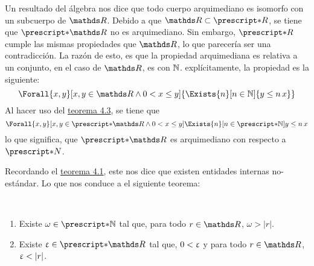 Un resultado del álgebra nos dice que todo cuerpo arquimediano es
isomorfo con un subcuerpo de $\R$. Debido a que $\R\subset\st{R}$, se
tiene que $\st{\R}$ no es arquimediano. Sin embargo, $\st{R}$ cumple
las mismas propiedades que $\R$, lo que parecería ser una contradicción.
La razón de esto, es que la propiedad arquimediana es relativa a un
conjunto, en el caso de $\R$, es con $\mathbb{N}$. explícitamente, la propiedad
es la siguiente:
\[\Forall{x,y}[x,y\in\R\land0<x\leq y]{\Exists{n}[n\in\N]{y\leq n\,x}}\]
Al hacer uso del \hyperref[theo:FT]{teorema 4.3}, se tiene que
\[\Forall{x,y}[x,y\in\st{\R}\land 0<x\leq y]{\Exists{n}[n\in\st{\N}]{y\leq n\,x}}\]
lo que significa, que $\st{\R}$ es arquimediano con respecto a $\st{N}$.

Recordando el \hyperref[theo:noEst]{teorema 4.1}, este nos dice que existen
entidades internas no-estándar. Lo que nos conduce a el siguiente teorema:

\begin{theorem}~
  \begin{enumerate}
    \item Existe $\omega\in\st{\N}$ tal que, para todo $r\in\R$,
          $\omega>|r|$.
    \item Existe $\e\in\st{\R}$ tal que, $0<\upvarepsilon$ y para todo $r\in\R$,
          $\upvarepsilon < |r|$.
  \end{enumerate}
\end{theorem}

